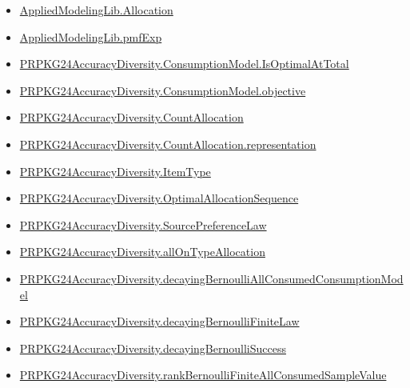 \documentclass[10pt]{article}
\begin{document}
\begin{itemize}\raggedright
\item \hyperlink{governing-declaration-6972368b41f26c5a}{Applied\allowbreak{}Modeling\allowbreak{}Lib.\allowbreak{}Allocation}
\item \hyperlink{governing-declaration-8e4b4389a4f6454b}{Applied\allowbreak{}Modeling\allowbreak{}Lib.\allowbreak{}pmf\allowbreak{}Exp}
\item \hyperlink{governing-declaration-dce768684c24aad2}{PRPKG24\allowbreak{}Accuracy\allowbreak{}Diversity.\allowbreak{}Consumption\allowbreak{}Model.\allowbreak{}Is\allowbreak{}Optimal\allowbreak{}At\allowbreak{}Total}
\item \hyperlink{governing-declaration-3ab045ef5e79a864}{PRPKG24\allowbreak{}Accuracy\allowbreak{}Diversity.\allowbreak{}Consumption\allowbreak{}Model.\allowbreak{}objective}
\item \hyperlink{governing-declaration-4fbd8fa467bd5d78}{PRPKG24\allowbreak{}Accuracy\allowbreak{}Diversity.\allowbreak{}Count\allowbreak{}Allocation}
\item \hyperlink{paper-prerequisite-29fb13a9ce74aef5}{PRPKG24\allowbreak{}Accuracy\allowbreak{}Diversity.\allowbreak{}Count\allowbreak{}Allocation.\allowbreak{}representation}
\item \hyperlink{governing-declaration-562ef32e180a12be}{PRPKG24\allowbreak{}Accuracy\allowbreak{}Diversity.\allowbreak{}Item\allowbreak{}Type}
\item \hyperlink{governing-declaration-98821e74d0c4230b}{PRPKG24\allowbreak{}Accuracy\allowbreak{}Diversity.\allowbreak{}Optimal\allowbreak{}Allocation\allowbreak{}Sequence}
\item \hyperlink{governing-declaration-e662f313179ba80f}{PRPKG24\allowbreak{}Accuracy\allowbreak{}Diversity.\allowbreak{}Source\allowbreak{}Preference\allowbreak{}Law}
\item \hyperlink{governing-declaration-292edfa75481381f}{PRPKG24\allowbreak{}Accuracy\allowbreak{}Diversity.\allowbreak{}all\allowbreak{}On\allowbreak{}Type\allowbreak{}Allocation}
\item \hyperlink{governing-declaration-12a34afd4b88cbd0}{PRPKG24\allowbreak{}Accuracy\allowbreak{}Diversity.\allowbreak{}decaying\allowbreak{}Bernoulli\allowbreak{}All\allowbreak{}Consumed\allowbreak{}Consumption\allowbreak{}Model}
\item \hyperlink{governing-declaration-103e1c9b673519e0}{PRPKG24\allowbreak{}Accuracy\allowbreak{}Diversity.\allowbreak{}decaying\allowbreak{}Bernoulli\allowbreak{}Finite\allowbreak{}Law}
\item \hyperlink{governing-declaration-ffcc682774320c24}{PRPKG24\allowbreak{}Accuracy\allowbreak{}Diversity.\allowbreak{}decaying\allowbreak{}Bernoulli\allowbreak{}Success}
\item \hyperlink{governing-declaration-8d7cdc77afbd77b9}{PRPKG24\allowbreak{}Accuracy\allowbreak{}Diversity.\allowbreak{}rank\allowbreak{}Bernoulli\allowbreak{}Finite\allowbreak{}All\allowbreak{}Consumed\allowbreak{}Sample\allowbreak{}Value}
\end{itemize}
\end{document}

